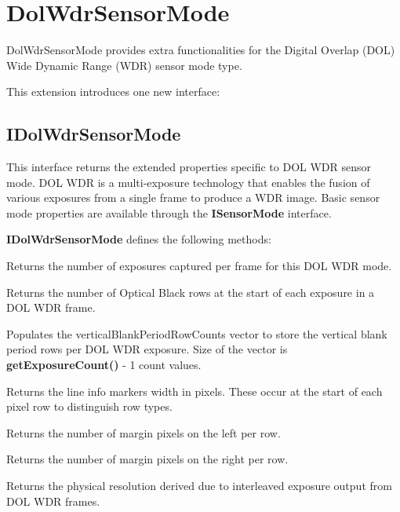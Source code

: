 \documentclass[11pt]{article}
\newcommand{\classname}[1]{\textbf{#1}}
\newcommand{\methodname}[1]{\textbf{#1}}
\begin{document}
\section{DolWdrSensorMode}

DolWdrSensorMode provides extra functionalities for the Digital Overlap (DOL) Wide Dynamic
Range (WDR) sensor mode type.

This extension introduces one new interface:
\subsection{IDolWdrSensorMode} This interface returns the extended properties specific to
DOL WDR sensor mode. DOL WDR is a multi-exposure technology that enables the fusion of
various exposures from a single frame to produce a WDR image. Basic sensor mode
properties are available through the \classname{ISensorMode} interface.

\classname{IDolWdrSensorMode} defines the following methods:
\begin{description}[style=nextline,align=left,leftmargin=4em]
\item[getExposureCount()] Returns the number of exposures captured per frame for this
DOL WDR mode.
\item[getOpticalBlackRowCount()] Returns the number of Optical Black rows at the start
of each exposure in a DOL WDR frame.
\item[getVerticalBlankPeriodRowCount()] Populates the verticalBlankPeriodRowCounts vector to
store the vertical blank period rows per DOL WDR exposure. Size of the vector is
\methodname{getExposureCount()} - 1 count values.
\item[getLineInfoMarkerWidth()] Returns the line info markers width in pixels.
These occur at the start of each pixel row to distinguish row types.
\item[getLeftMarginWidth()] Returns the number of margin pixels on the left per row.
\item[getRightMarginWidth()] Returns the number of margin pixels on the right per row.
\item[getPhysicalResolution()] Returns the physical resolution derived due to interleaved
exposure output from DOL WDR frames.
\end{description}
\end{document}
